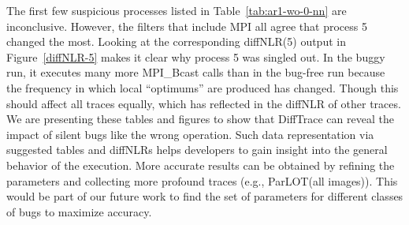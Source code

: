 The first few suspicious processes listed in Table~\ref{tab:ar1-wo-0-nn} are inconclusive. However, the filters that include MPI all agree that process 5 changed the most.
%
Looking at the corresponding diffNLR(5) output in Figure~\ref{diffNLR-5} makes it clear why process 5 was singled out. In the buggy run, it executes many more MPI\_Bcast calls than in the bug-free run because the frequency in which local ``optimums'' are produced has changed. Though this should affect all traces equally, which has reflected in the diffNLR of other traces. We are presenting these tables and figures to show that DiffTrace can reveal the impact of silent bugs like the wrong operation. Such data representation via suggested tables and diffNLRs helps developers to gain insight into the general behavior of the execution. More accurate results can be obtained by refining the parameters and collecting more profound traces (e.g., ParLOT(all images)). This would be part of our future work to find the set of parameters for different classes of bugs to maximize accuracy.







